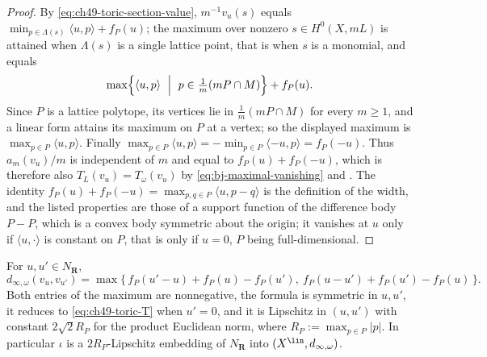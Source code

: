 \begin{proof}
By \eqref{eq:ch49-toric-section-value}, $m^{-1}v_u(s)$ equals
$\min_{p\in\Lambda(s)}\langle u,p\rangle+f_P(u)$; the maximum over
nonzero $s\in H^0(X,mL)$ is attained when $\Lambda(s)$ is a single
lattice point, that is when $s$ is a monomial, and equals
\[
 \max\Bigl\{\langle u,p\rangle\ \Bigm|\ p\in\tfrac1m(mP\cap M)\Bigr\}
 +f_P(u).
\]
Since $P$ is a lattice polytope, its vertices lie in $\tfrac1m(mP\cap M)$
for every $m\ge1$, and a linear form attains its maximum on $P$ at a
vertex; so the displayed maximum is $\max_{p\in P}\langle u,p\rangle$.
Finally $\max_{p\in P}\langle u,p\rangle
=-\min_{p\in P}\langle-u,p\rangle=f_P(-u)$.  Thus $a_m(v_u)/m$ is
independent of $m$ and equal to $f_P(u)+f_P(-u)$, which is therefore
also $T_L(v_u)=T_\omega(v_u)$ by
\eqref{eq:bj-maximal-vanishing} and .  The
identity $f_P(u)+f_P(-u)=\max_{p,q\in P}\langle u,p-q\rangle$ is the
definition of the width, and the listed properties are those of a support
function of the difference body $P-P$, which is a convex body symmetric
about the origin; it vanishes at $u$ only if $\langle u,\cdot\rangle$ is
constant on $P$, that is only if $u=0$, $P$ being
full-dimensional.
\end{proof}

\begin{proposition}
\label{prop:ch49-toric-dinfty}
For $u,u'\in N_{\mathbf R}$,
\[
 d_{\infty,\omega}(v_u,v_{u'})
 =\max\bigl\{\,f_P(u'-u)+f_P(u)-f_P(u'),
              \ f_P(u-u')+f_P(u')-f_P(u)\,\bigr\}.
\tag{49.24}\label{eq:ch49-toric-dinfty}
\]
Both entries of the maximum are nonnegative, the formula is symmetric in
$u,u'$, it reduces to \eqref{eq:ch49-toric-T} when $u'=0$, and it is
Lipschitz in $(u,u')$ with constant $2\sqrt2 R_P$ for the product
Euclidean norm, where $R_P:=\max_{p\in P}|p|$.
In particular $\iota$ is a $2R_P$-Lipschitz embedding of
$N_{\mathbf R}$ into $(X^{\lin},d_{\infty,\omega})$.
\end{proposition}

